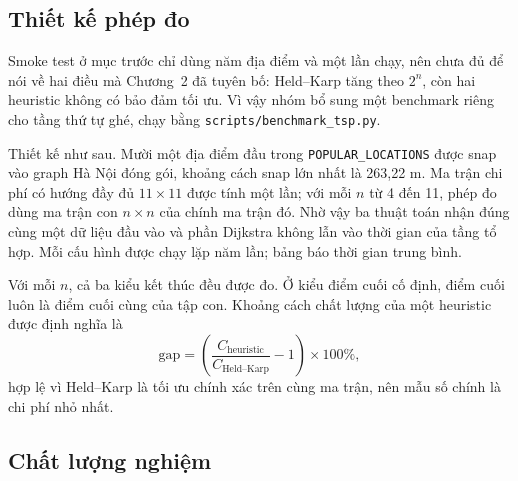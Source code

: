 \subsection{Thiết kế phép đo}

Smoke test ở mục trước chỉ dùng năm địa điểm và một lần chạy, nên chưa đủ để nói
về hai điều mà Chương~2 đã tuyên bố: Held--Karp tăng theo $2^n$, còn hai heuristic
không có bảo đảm tối ưu. Vì vậy nhóm bổ sung một benchmark riêng cho tầng thứ tự
ghé, chạy bằng \texttt{scripts/benchmark\_tsp.py}.

Thiết kế như sau. Mười một địa điểm đầu trong \texttt{POPULAR\_LOCATIONS} được
snap vào graph Hà Nội đóng gói, khoảng cách snap lớn nhất là 263,22 m. Ma trận chi
phí có hướng đầy đủ $11\times 11$ được tính một lần; với mỗi $n$ từ 4 đến 11, phép
đo dùng ma trận con $n\times n$ của chính ma trận đó. Nhờ vậy ba thuật toán nhận
đúng cùng một dữ liệu đầu vào và phần Dijkstra không lẫn vào thời gian của tầng tổ
hợp. Mỗi cấu hình được chạy lặp năm lần; bảng báo thời gian trung bình.

Với mỗi $n$, cả ba kiểu kết thúc đều được đo. Ở kiểu điểm cuối cố định, điểm cuối
luôn là điểm cuối cùng của tập con. Khoảng cách chất lượng của một heuristic được
định nghĩa là
\[
  \mathrm{gap} = \left(\frac{C_{\text{heuristic}}}{C_{\text{Held--Karp}}}-1\right)\times 100\%,
\]
hợp lệ vì Held--Karp là tối ưu chính xác trên cùng ma trận, nên mẫu số chính là
chi phí nhỏ nhất.

\subsection{Chất lượng nghiệm}

